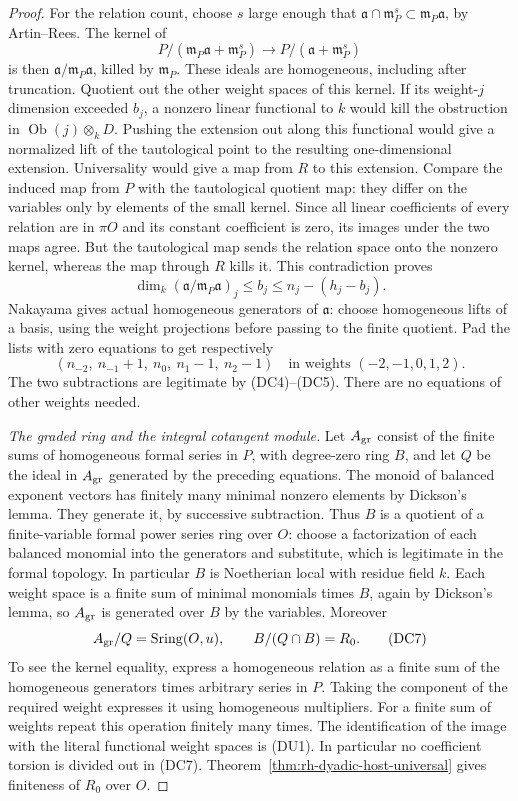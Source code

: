 \begin{proof}
For the relation count, choose $s$ large enough that
$\mathfrak a\cap\mathfrak m_P^s\subset
\mathfrak m_P\mathfrak a$, by Artin--Rees. The kernel of
\[
 P/(\mathfrak m_P\mathfrak a+\mathfrak m_P^s)
          \longrightarrow P/(\mathfrak a+\mathfrak m_P^s)
\]
is then $\mathfrak a/\mathfrak m_P\mathfrak a$, killed by
$\mathfrak m_P$. These ideals are homogeneous, including after
truncation. Quotient out the other weight spaces of this
kernel. If its weight-$j$ dimension exceeded $b_j$, a nonzero
linear functional to $k$ would kill the obstruction in
$\operatorname{Ob}(j)\otimes_k D$.
Pushing the extension out along this functional would give a
normalized lift of the tautological point to the resulting
one-dimensional extension. Universality would give a map from
$R$ to this extension. Compare the induced map from $P$ with the
tautological quotient map: they differ on the variables only
by elements of the small kernel. Since all linear coefficients
of every relation are in $\pi O$ and its constant coefficient
is zero, its images under the two maps agree. But the
tautological map sends the relation space onto the nonzero
kernel, whereas the map through $R$ kills it. This contradiction
proves
\[
 \dim_k(\mathfrak a/\mathfrak m_P\mathfrak a)_j
       \le b_j\le n_j-(h_j-b_j).                               \tag{DC5}
\]
Nakayama gives actual homogeneous generators of $\mathfrak a$:
choose homogeneous lifts of a basis, using the weight projections
before passing to the finite quotient. Pad the lists with zero
equations to get respectively
\[
 (n_{-2},\ n_{-1}+1,\ n_0,\ n_1-1,\ n_2-1)
 \quad\text{in weights }(-2,-1,0,1,2).                         \tag{DC6}
\]
The two subtractions are legitimate by (DC4)--(DC5).
There are no equations of other weights needed.

\emph{The graded ring and the integral cotangent module.}
Let $A_{\rm gr}$ consist of the finite sums of homogeneous
formal series in $P$, with degree-zero ring $B$, and let $Q$
be the ideal in $A_{\rm gr}$ generated by the preceding equations.
The monoid of balanced exponent vectors has finitely many minimal
nonzero elements by Dickson's lemma. They generate it, by successive
subtraction. Thus $B$ is a quotient of a finite-variable formal
power series ring over $O$: choose a factorization of each balanced
monomial into the generators and substitute, which is legitimate
in the formal topology. In particular $B$ is Noetherian local
with residue field $k$. Each weight space is a finite sum of
minimal monomials times $B$, again by Dickson's lemma, so
$A_{\rm gr}$ is generated over $B$ by the variables.
Moreover
\[
 A_{\rm gr}/Q=\operatorname{Sring}(O,u),\qquad
 B/(Q\cap B)=R_0.                                               \tag{DC7}
\]
To see the kernel equality, express a homogeneous relation as a
finite sum of the homogeneous generators times arbitrary series
in $P$. Taking the component of the required weight expresses
it using homogeneous multipliers. For a finite sum of weights
repeat this operation finitely many times. The identification of
the image with the literal functional weight spaces is (DU1).
In particular no coefficient torsion is divided out in (DC7).
Theorem~\ref{thm:rh-dyadic-host-universal} gives finiteness of $R_0$
over $O$.


\end{proof}

